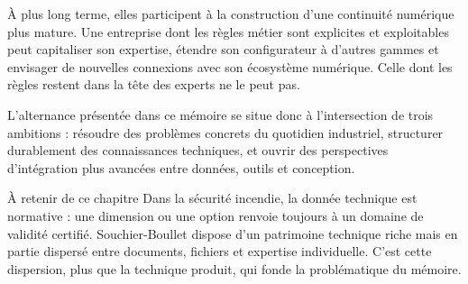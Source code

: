 À plus long terme, elles participent à la construction d'une continuité numérique plus mature. Une entreprise dont les règles métier sont explicites et exploitables peut capitaliser son expertise, étendre son configurateur à d'autres gammes et envisager de nouvelles connexions avec son écosystème numérique. Celle dont les règles restent dans la tête des experts ne le peut pas.

L'alternance présentée dans ce mémoire se situe donc à l'intersection de trois ambitions : résoudre des problèmes concrets du quotidien industriel, structurer durablement des connaissances techniques, et ouvrir des perspectives d'intégration plus avancées entre données, outils et conception.

\begin{encadretitre}{À retenir de ce chapitre}
Dans la sécurité incendie, la donnée technique est normative : une dimension ou une option renvoie toujours à un domaine de validité certifié. Souchier-Boullet dispose d'un patrimoine technique riche mais en partie dispersé entre documents, fichiers et expertise individuelle. C'est cette dispersion, plus que la technique produit, qui fonde la problématique du mémoire.
\end{encadretitre}
